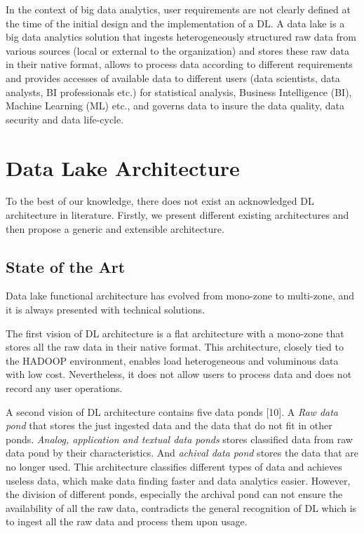\documentclass[a4paper,12pt,notitlepage,twoside,openright]{article}
\begin{document}
In the context of big data analytics, user requirements are not clearly
defined at the time of the initial design and the implementation of a
DL. A data lake is a big data analytics solution that ingests
heterogeneously structured raw data from various sources (local or
external to the organization) and stores these raw data in their native
format, allows to process data according to different requirements and
provides accesses of available data to different users (data scientists,
data analysts, BI professionals etc.) for statistical analysis, Business
Intelligence (BI), Machine Learning (ML) etc., and governs data to
insure the data quality, data security and data life-cycle.

\hypertarget{data-lake-architecture}{%
\section{Data Lake Architecture}\label{data-lake-architecture}}

To the best of our knowledge, there does not exist an acknowledged DL
architecture in literature. Firstly, we present different existing
architectures and then propose a generic and extensible architecture.

\hypertarget{state-of-the-art-1}{%
\subsection{State of the Art}\label{state-of-the-art-1}}

Data lake functional architecture has evolved from mono-zone to
multi-zone, and it is always presented with technical solutions.

The first vision of DL architecture is a flat architecture with a
mono-zone that stores all the raw data in their native format. This
architecture, closely tied to the HADOOP environment, enables load
heterogeneous and voluminous data with low cost. Nevertheless, it does
not allow users to process data and does not record any user operations.

A second vision of DL architecture contains five data ponds {[}10{]}. A
\emph{Raw data pond} that stores the just ingested data and the data
that do not fit in other ponds. \emph{Analog, application and textual
data ponds} stores classified data from raw data pond by their
characteristics. And \emph{achival data pond} stores the data that are
no longer used. This architecture classifies different types of data and
achieves useless data, which make data finding faster and data analytics
easier. However, the division of different ponds, especially the
archival pond can not ensure the availability of all the raw data,
contradicts the general recognition of DL which is to ingest all the raw
data and process them upon usage.
\end{document}
